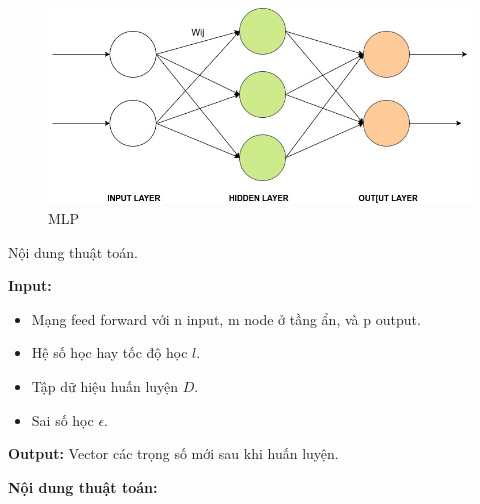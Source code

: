 		\begin{figure}[h!]
			\centering
			\includegraphics[scale=0.5]{charts/back.jpg}
			\caption{MLP}
			\label{fig:back}
		\end{figure}
		\pagebreak
		Nội dung thuật toán.\par
		\textbf{Input:}
		\begin{itemize}
			\item Mạng feed forward với n input, m node ở tầng ẩn, và p output.
			\item Hệ số học hay tốc độ học \(l\).
			\item Tập dữ hiệu huấn luyện \(D\).
			\item Sai số học \(\epsilon\).
		\end{itemize}
		\textbf{Output:} Vector các trọng số mới sau khi huấn luyện.
		
		\textbf{Nội dung thuật toán:}
		
